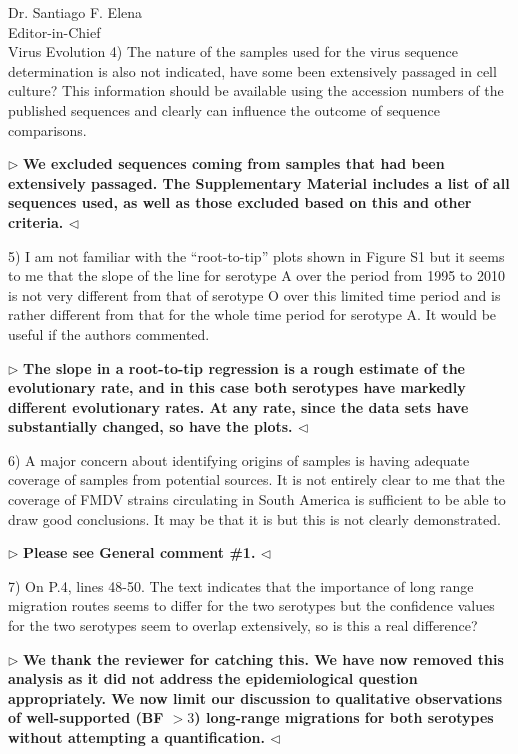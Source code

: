 \documentclass[12pt, a4paper]{letter} %
\newenvironment{reply}{$\triangleright$\bf}{$\triangleleft$}
\begin{document}
\begin{letter}{
	Dr. Santiago F. Elena\\
    Editor-in-Chief \\
    Virus Evolution
}
4) The nature of the samples used for the virus sequence determination is also not indicated, have some been extensively passaged in cell culture? 
This information should be available using the accession numbers of the published sequences and clearly can influence the outcome of sequence comparisons.

\begin{reply}
We excluded sequences coming from samples that had been extensively passaged. 
The Supplementary Material includes a list of all sequences used, as well as those excluded based on this and other criteria. 
\end{reply}

5) I am not familiar with the ``root-to-tip'' plots shown in Figure S1 but it seems to me that the slope of the line for serotype A over the period from 1995 to 2010 is not very different from that of serotype O over this limited time period and is rather different from that for the whole time period for serotype A. 
It would be useful if the authors commented.

\begin{reply}
The slope in a root-to-tip regression is a rough estimate of the evolutionary rate, and in this case both serotypes have markedly different evolutionary rates.
At any rate, since the data sets have substantially changed, so have the plots.
\end{reply}

6)      A major concern about identifying origins of samples is having adequate coverage of samples from potential sources. 
It is not entirely clear to me that the coverage of FMDV strains circulating in South America is sufficient to be able to draw good conclusions. 
It may be that it is but this is not clearly demonstrated.

\begin{reply}
Please see General comment \#1.
\end{reply}

7)      On P.4, lines 48-50. The text indicates that the importance of long range migration routes seems to differ for the two serotypes but the confidence values for the two serotypes seem to overlap extensively, so is this a real difference?

\begin{reply}
We thank the reviewer for catching this.
We have now removed this analysis as it did not address the epidemiological question appropriately.
We now limit our discussion to qualitative observations of well-supported (BF $>3$) long-range migrations for both serotypes without attempting a quantification. 
\end{reply}


\end{letter}
\end{document}

